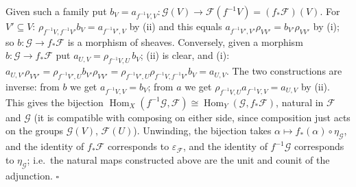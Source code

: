 \documentclass[11pt]{article}
\begin{document}
Given such a family put $b_V=a_{f^{-1}V,V}\colon\mathcal G(V)\to\mathcal F(f^{-1}V)=(f_*\mathcal F)(V)$. For $V'\subseteq V$: $\rho_{f^{-1}V,f^{-1}V'}b_V=a_{f^{-1}V',V}$ by (ii) and this equals $a_{f^{-1}V',V'}\rho_{VV'}=b_{V'}\rho_{VV'}$ by (i); so $b\colon\mathcal G\to f_*\mathcal F$ is a morphism of sheaves. Conversely, given a morphism $b\colon\mathcal G\to f_*\mathcal F$ put $a_{U,V}=\rho_{f^{-1}V,U}\,b_V$; (ii) is clear, and (i): $a_{U,V'}\rho_{VV'}=\rho_{f^{-1}V',U}b_{V'}\rho_{VV'}=\rho_{f^{-1}V',U}\rho_{f^{-1}V,f^{-1}V'}b_V=a_{U,V}$. The two constructions are inverse: from $b$ we get $a_{f^{-1}V,V}=b_V$; from $a$ we get $\rho_{f^{-1}V,U}a_{f^{-1}V,V}=a_{U,V}$ by (ii). This gives the bijection $\operatorname{Hom}_X(f^{-1}\mathcal G,\mathcal F)\cong\operatorname{Hom}_Y(\mathcal G,f_*\mathcal F)$, natural in $\mathcal F$ and $\mathcal G$ (it is compatible with composing on either side, since composition just acts on the groups $\mathcal G(V)$, $\mathcal F(U)$). Unwinding, the bijection takes $\alpha\mapsto f_*(\alpha)\circ\eta_{\mathcal G}$, and the identity of $f_*\mathcal F$ corresponds to $\varepsilon_{\mathcal F}$, and the identity of $f^{-1}\mathcal G$ corresponds to $\eta_{\mathcal G}$; i.e.\ the natural maps constructed above are the unit and counit of the adjunction. \hfill$\square$
\end{document}
